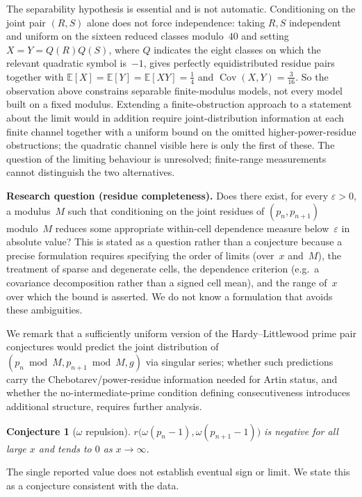 \documentclass[11pt]{amsart}
\newtheorem{conjecture}{Conjecture}
\theoremstyle{definition}
\newcommand{\E}{\mathbb{E}}
\begin{document}
The separability hypothesis is essential and is not automatic. Conditioning
on the joint pair $(R,S)$ alone does not force independence: taking $R,S$
independent and uniform on the sixteen reduced classes modulo~$40$ and setting
$X = Y = Q(R)Q(S)$, where $Q$ indicates the eight classes on which the
relevant quadratic symbol is~$-1$, gives perfectly equidistributed residue
pairs together with $\E[X] = \E[Y] = \E[XY] = \tfrac14$ and
$\operatorname{Cov}(X,Y) = \tfrac{3}{16}$. So the observation above constrains
separable finite-modulus models, not every model built on a fixed modulus.
Extending a finite-obstruction approach to a statement about the limit would
in addition require joint-distribution information at each finite channel
together with a uniform bound on the omitted higher-power-residue
obstructions; the quadratic channel visible here is only the first of these.
The question of the limiting behaviour is unresolved; finite-range
measurements cannot distinguish the two alternatives.

\textbf{Research question (residue completeness).}
Does there exist, for every $\varepsilon > 0$, a modulus~$M$ such that
conditioning on the joint residues of $(p_n, p_{n+1})$ modulo~$M$ reduces
some appropriate within-cell dependence measure below~$\varepsilon$ in
absolute value? This is stated as a question rather than a conjecture because
a precise formulation requires specifying the order of limits (over~$x$
and~$M$), the treatment of sparse and degenerate cells, the dependence
criterion (e.g.\ a covariance decomposition rather than a signed cell mean),
and the range of~$x$ over which the bound is asserted. We do not know a
formulation that avoids these ambiguities.

We remark that a sufficiently uniform version of the Hardy--Littlewood prime
pair conjectures would predict the joint distribution of
$(p_n \bmod M, p_{n+1} \bmod M, g)$ via singular series; whether such
predictions carry the Chebotarev/power-residue information needed for Artin
status, and whether the no-intermediate-prime condition defining
consecutiveness introduces additional structure, requires further analysis.

\begin{conjecture}[$\omega$ repulsion]
	\label{conj:omega}
	$r\bigl(\omega(p_n-1), \omega(p_{n+1}-1)\bigr)$ is negative for all large $x$
	and tends to $0$ as $x \to \infty$.
\end{conjecture}

The single reported value does not establish eventual sign or limit. We state
this as a conjecture consistent with the data.
\end{document}
